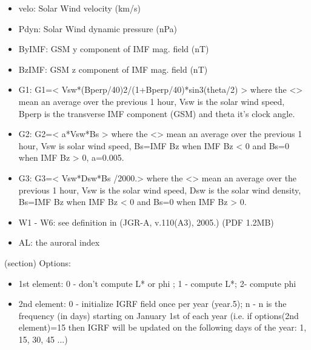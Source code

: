 \begin{boxedminipage}{\funcwidth}
\begin{itemize}
        \item velo: Solar Wind velocity (km/s)

        \item Pdyn: Solar Wind dynamic pressure (nPa)

        \item ByIMF: GSM y component of IMF mag. field (nT)

        \item BzIMF: GSM z component of IMF mag. field (nT)

        \item G1:  G1={\textless} Vsw*(Bperp/40)2/(1+Bperp/40)*sin3(theta/2) 
          {\textgreater} where the {\textless}{\textgreater} mean an 
          average over the previous 1 hour, Vsw is the solar wind speed, 
          Bperp is the transverse IMF component (GSM) and theta it's clock 
          angle.

        \item G2: G2={\textless} a*Vsw*Bs {\textgreater} where the 
          {\textless}{\textgreater} mean an average over the previous 1 
          hour, Vsw is solar wind speed, Bs={\textbar}IMF Bz{\textbar} when
          IMF Bz {\textless} 0 and Bs=0 when IMF Bz {\textgreater} 0, 
          a=0.005.

        \item G3:  G3={\textless} Vsw*Dsw*Bs /2000.{\textgreater} where the 
          {\textless}{\textgreater} mean an average over the previous 1 
          hour, Vsw is the solar wind speed, Dsw is the solar wind density,
          Bs={\textbar}IMF Bz{\textbar} when IMF Bz {\textless} 0 and Bs=0 
          when IMF Bz {\textgreater} 0.

        \item W1 - W6: see definition in (JGR-A, v.110(A3), 2005.) (PDF 1.2MB)

        \item AL: the auroral index

      \end{itemize}

    (section) Options:

      \begin{itemize}
      \setlength{\parskip}{0.6ex}
        \item 1st element: 0 - don't compute L* or phi ;  1 - compute L*; 2- 
          compute phi

        \item 2nd element: 0 - initialize IGRF field once per year (year.5); n 
          - n is the  frequency (in days) starting on January 1st of each 
          year (i.e. if options(2nd element)=15 then IGRF will be updated 
          on the following days of the year: 1, 15, 30, 45 ...)


\end{itemize}
\end{boxedminipage}
